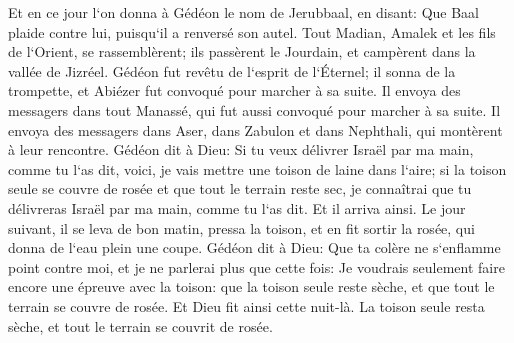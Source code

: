 \verse Et en ce jour l`on donna à Gédéon le nom de Jerubbaal, en disant: Que Baal plaide contre lui, puisqu`il a renversé son autel. 
\verse Tout Madian, Amalek et les fils de l`Orient, se rassemblèrent; ils passèrent le Jourdain, et campèrent dans la vallée de Jizréel. 
\verse Gédéon fut revêtu de l`esprit de l`Éternel; il sonna de la trompette, et Abiézer fut convoqué pour marcher à sa suite. 
\verse Il envoya des messagers dans tout Manassé, qui fut aussi convoqué pour marcher à sa suite. Il envoya des messagers dans Aser, dans Zabulon et dans Nephthali, qui montèrent à leur rencontre. 
\verse Gédéon dit à Dieu: Si tu veux délivrer Israël par ma main, comme tu l`as dit, 
\verse voici, je vais mettre une toison de laine dans l`aire; si la toison seule se couvre de rosée et que tout le terrain reste sec, je connaîtrai que tu délivreras Israël par ma main, comme tu l`as dit. 
\verse Et il arriva ainsi. Le jour suivant, il se leva de bon matin, pressa la toison, et en fit sortir la rosée, qui donna de l`eau plein une coupe. 
\verse Gédéon dit à Dieu: Que ta colère ne s`enflamme point contre moi, et je ne parlerai plus que cette fois: Je voudrais seulement faire encore une épreuve avec la toison: que la toison seule reste sèche, et que tout le terrain se couvre de rosée. 
\verse Et Dieu fit ainsi cette nuit-là. La toison seule resta sèche, et tout le terrain se couvrit de rosée. 

